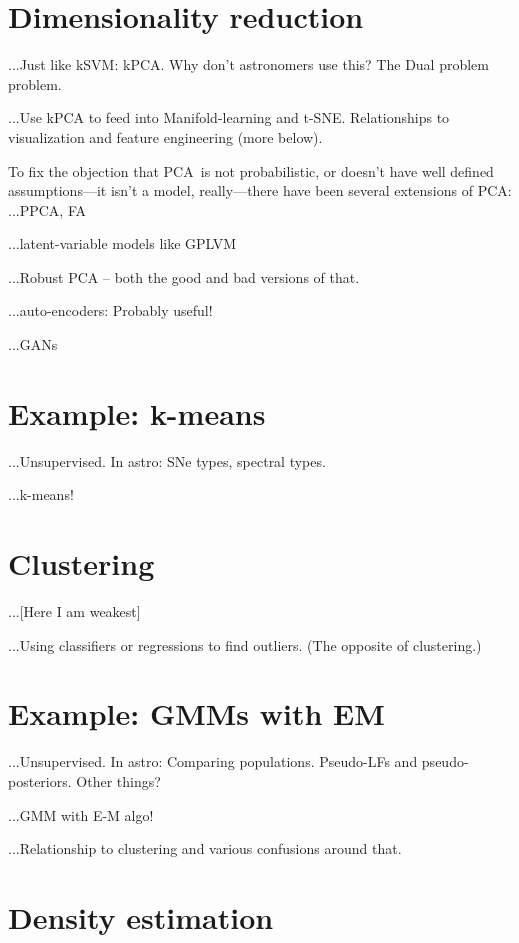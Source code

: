 \documentclass[12pt, twoside, letterpaper]{article}
\newcommand{\acronym}[1]{{\small{#1}}}
\newcommand{\PCA}{\acronym{PCA}}
\begin{document}
\section{Dimensionality reduction}

...Just like kSVM: kPCA. Why don't astronomers use this? The Dual problem problem.

...Use kPCA to feed into Manifold-learning and t-SNE.
Relationships to visualization and feature engineering (more below).

To fix the objection that \PCA\ is not probabilistic, or doesn't have well
defined assumptions---it isn't a model, really---there have been several
extensions of \PCA:
...PPCA, FA

...latent-variable models like GPLVM

...Robust PCA -- both the good and bad versions of that.

...auto-encoders: Probably useful!

...GANs

\section{Example: k-means}

...Unsupervised. In astro: SNe types, spectral types.

...k-means!

\section{Clustering}

...[Here I am weakest]

...Using classifiers or regressions to find outliers. (The opposite of clustering.)

\section{Example: GMMs with EM}

...Unsupervised. In astro: Comparing populations. Pseudo-LFs and pseudo-posteriors. Other things?

...GMM with E-M algo!

...Relationship to clustering and various confusions around that.

\section{Density estimation}
\end{document}
